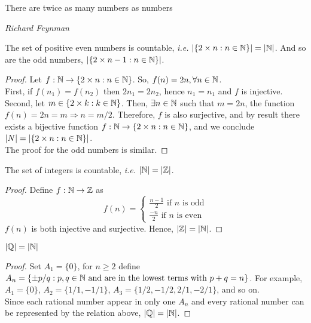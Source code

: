 \epigraph{There are twice as many numbers as numbers}{\textit{Richard Feynman}}

\begin{theorem}
    The set of positive even numbers is countable, \emph{i.e.} $|\{ 2\times n: n \in \mathbb{N}\}| = |\mathbb{N}|$. And so are the odd numbers, $|\{ 2\times n - 1: n \in \mathbb{N}\}|$.
\end{theorem}

\begin{proof}
    Let $f: \mathbb{N} \to \{2 \times n: n \in \mathbb{N} \}$. So, $f(n) = 2n, \forall n \in \mathbb{N}$. \\
    First, if $f(n_1) = f(n_2)$ then $2n_1 = 2n_2$, hence $n_1 = n_1$ and $f$ is injective. \\
    Second, let $m \in \{ 2\times k: k \in \mathbb{N}\}$. Then, $\exists n \in \mathbb{N}$ such that $m = 2n$, the function $f(n) = 2n = m \Rightarrow n = m/2$. Therefore, $f$ is also surjective, and by result there exists a bijective function $f: \mathbb{N} \to \{2 \times n: n \in \mathbb{N} \}$, and we conclude $|N| = |\{ 2\times n: n \in \mathbb{N}\}|$. \\
    The proof for the odd numbers is similar.
\end{proof}

\begin{theorem}[Countability of $\Z$]
    The set of integers is countable, \emph{i.e.} $|\mathbb{N}| = |\mathbb{Z}|$.
\end{theorem}

\begin{proof}
    Define $f: \mathbb{N} \to \mathbb{Z}$ as
    \begin{equation*}
        f(n) = \begin{cases}
            \frac{n-1}{2} \text{ if } n \text{ is odd} \\
            \frac{-n}{2} \text{ if } n \text{ is even}
        \end{cases}
    \end{equation*}
    $f(n)$ is both injective and surjective. Hence, $|\mathbb{Z}| = |\mathbb{N}|$.
\end{proof}

\begin{theorem}[Countability of $\Q$]
    $|\mathbb{Q}| = |\mathbb{N}|$
\end{theorem}

\begin{proof}
    Set $A_1 = \{0 \}$, for $n \geq 2$ define $A_n = \{ \pm p/q: p,q \in \mathbb{N} \text{ and are in the lowest terms with } p + q = n\}$. For example, $A_1 = \{0\}$, $A_2 =\{ 1/1, -1/1\}$, $A_3 = \{ 1/2, -1/2, 2/1, -2/1\}$, and so on.\\
    Since each rational number appear in only one $A_n$ and every rational number can be represented by the relation above, $|\mathbb{Q}| = |\mathbb{N}|$.
\end{proof}

